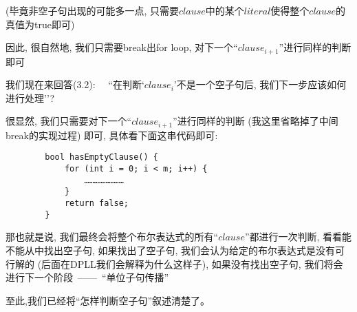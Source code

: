         (毕竟非空子句出现的可能多一点,
        只需要$clause$中的某个$literal$使得整个$clause$的真值为true即可)
        \par
        因此,
        很自然地,
        我们只需要break出for loop,
        对下一个``$clause_{i+1}$''进行同样的判断即可
        \newline
        \par
        我们现在来回答(3.2):
        $\quad$``在判断`$clause_{i}$'不是一个空子句后,
        我们下一步应该如何进行处理''?
        \newline
        \par
        很显然,
        我们只需要对下一个``$clause_{i+1}$''进行同样的判断
        (我这里省略掉了中间break的实现过程)
        即可,
        具体看下面这串代码即可:
        \begin{lstlisting}
        bool hasEmptyClause() {
            for (int i = 0; i < m; i++) {
                ……………………
            }
            return false;
        }
        \end{lstlisting}
        \par
        那也就是说,
        我们最终会将整个布尔表达式的所有``$clause$''都进行一次判断,
        看看能不能从中找出空子句,
        如果找出了空子句,
        我们会认为给定的布尔表达式是没有可行解的
        (后面在DPLL我们会解释为什么这样子),
        如果没有找出空子句,
        我们将会进行下一个阶段\ ——\ ``单位子句传播''
        \par
        至此,我们已经将``怎样判断空子句''叙述清楚了。
        
